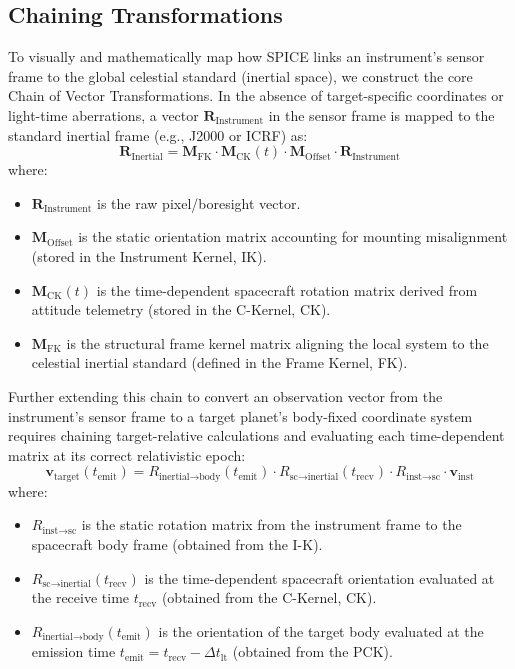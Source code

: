 \documentclass{acta}
\begin{document}
\subsection{Chaining Transformations}
To visually and mathematically map how SPICE links an instrument's sensor frame to the global celestial standard (inertial space), we construct the core Chain of Vector Transformations. In the absence of target-specific coordinates or light-time aberrations, a vector $\mathbf{R}_{\text{Instrument}}$ in the sensor frame is mapped to the standard inertial frame (e.g., J2000 or ICRF) as:
\begin{equation}
\mathbf{R}_{\text{Inertial}} = \mathbf{M}_{\text{FK}} \cdot \mathbf{M}_{\text{CK}}(t) \cdot \mathbf{M}_{\text{Offset}} \cdot \mathbf{R}_{\text{Instrument}}
\end{equation}
where:
\begin{itemize}
\item $\mathbf{R}_{\text{Instrument}}$ is the raw pixel/boresight vector.
\item $\mathbf{M}_{\text{Offset}}$ is the static orientation matrix accounting for mounting misalignment (stored in the Instrument Kernel, IK).
\item $\mathbf{M}_{\text{CK}}(t)$ is the time-dependent spacecraft rotation matrix derived from attitude telemetry (stored in the C-Kernel, CK).
\item $\mathbf{M}_{\text{FK}}$ is the structural frame kernel matrix aligning the local system to the celestial inertial standard (defined in the Frame Kernel, FK).
\end{itemize}

Further extending this chain to convert an observation vector from the instrument's sensor frame to a target planet's body-fixed coordinate system requires chaining target-relative calculations and evaluating each time-dependent matrix at its correct relativistic epoch:
\begin{equation}
\mathbf{v}_{\text{target}}(t_{\text{emit}}) = R_{\text{inertial}\rightarrow\text{body}}(t_{\text{emit}}) \cdot R_{\text{sc}\rightarrow\text{inertial}}(t_{\text{recv}}) \cdot R_{\text{inst}\rightarrow\text{sc}} \cdot \mathbf{v}_{\text{inst}}
\end{equation}
where:
\begin{itemize}
\item $R_{\text{inst}\rightarrow\text{sc}}$ is the static rotation matrix from the instrument frame to the spacecraft body frame (obtained from the I-K).
\item $R_{\text{sc}\rightarrow\text{inertial}}(t_{\text{recv}})$ is the time-dependent spacecraft orientation evaluated at the receive time $t_{\text{recv}}$ (obtained from the C-Kernel, CK).
\item $R_{\text{inertial}\rightarrow\text{body}}(t_{\text{emit}})$ is the orientation of the target body evaluated at the emission time $t_{\text{emit}} = t_{\text{recv}} - \Delta t_{\text{lt}}$ (obtained from the PCK).
\end{itemize}
\end{document}
